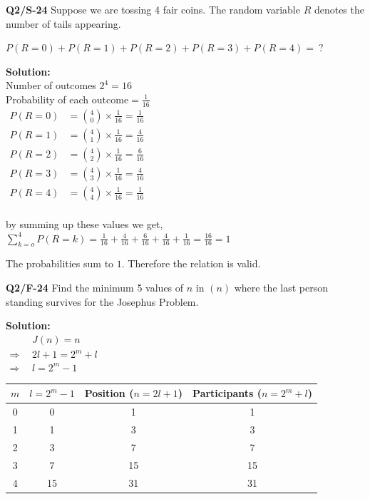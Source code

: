 \begin{multicols}{2}
\textbf{Q2/S-24}
Suppose we are tossing 4 fair coins. The random variable $R$ denotes the number of tails appearing.
\vspace{-1em}
\begin{center}
   $P(R=0) + P(R=1) + P(R=2) + P(R=3) + P(R=4) =\ ?$
\end{center}

\textbf{Solution:}\\[0.5em]
Number of outcomes $2^4 = 16$\\[0.5em]
Probability of each outcome$= \frac{1}{16}$\\[0.5em]
$\begin{aligned}
P(R=0) &= \binom{4}{0} \times \frac{1}{16} = \frac{1}{16} \\
P(R=1) &= \binom{4}{1} \times \frac{1}{16} = \frac{4}{16} \\
P(R=2) &= \binom{4}{2} \times \frac{1}{16} = \frac{6}{16} \\
P(R=3) &= \binom{4}{3} \times \frac{1}{16} = \frac{4}{16} \\
P(R=4) &= \binom{4}{4} \times \frac{1}{16} = \frac{1}{16} \\
\end{aligned}$

by summing up these values we get,\\[0.5em]
$\sum_{k=o}^{4}P(R=k) = \frac{1}{16} + \frac{4}{16} + \frac{6}{16} + \frac{4}{16} + \frac{1}{16} = \frac{16}{16} = 1$

The probabilities sum to $1$. Therefore the relation is valid.

\vspace{1em}
\textbf{Q2/F-24} Find the minimum 5 values of $n$ in $(n)$ where the last person standing survives for the Josephus Problem.

\textbf{Solution:}\\[0.5em]
$\begin{aligned}
   & J(n) = n \\
  \Rightarrow \ \ & 2l+1 = 2^m + l \\
  \Rightarrow \ \ & l = 2^m -1
\end{aligned}$

\begin{tabular}{|c|c|c|c|}\hline
   $m$ & $l = 2^m -1$
   &\makecell{Position \\ ($n = 2l + 1$)}
   &\makecell{Participants \\ ($n = 2^m + l$)}\\\hline
   0 & 0 & 1 & 1\\\hline
   1 & 1 & 3 & 3\\\hline
   2 & 3 & 7 & 7\\\hline
   3 & 7 & 15 & 15\\\hline
   4 & 15 & 31 & 31\\\hline
\end{tabular}



\end{multicols}
